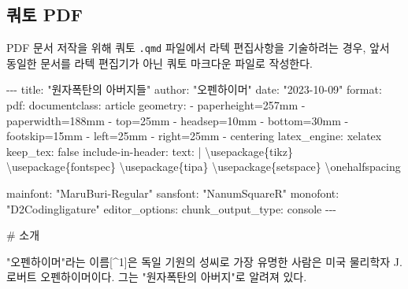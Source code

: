 \documentclass[
  letterpaper,
]{book}
\newenvironment{Shaded}{\begin{snugshade}}{\end{snugshade}}
\newcommand{\CommentTok}[1]{\textcolor[rgb]{0.37,0.37,0.37}{#1}}
\newcommand{\ExtensionTok}[1]{\textcolor[rgb]{0.00,0.23,0.31}{#1}}
\newcommand{\KeywordTok}[1]{\textcolor[rgb]{0.00,0.23,0.31}{#1}}
\newcommand{\NormalTok}[1]{\textcolor[rgb]{0.00,0.23,0.31}{#1}}
\newcommand{\PreprocessorTok}[1]{\textcolor[rgb]{0.68,0.00,0.00}{#1}}
\newcommand{\SpecialStringTok}[1]{\textcolor[rgb]{0.13,0.47,0.30}{#1}}
\newcommand{\StringTok}[1]{\textcolor[rgb]{0.13,0.47,0.30}{#1}}
\begin{document}
\hypertarget{uxcffcuxd1a0-pdf}{%
\subsection{쿼토 PDF}\label{uxcffcuxd1a0-pdf}}

PDF 문서 저작을 위해 쿼토 \texttt{.qmd} 파일에서 라텍 편집사항을
기술하려는 경우, 앞서 동일한 문서를 라텍 편집기가 아닌 쿼토 마크다운
파일로 작성한다.

\begin{Shaded}
\begin{Highlighting}[]
\ExtensionTok{{-}{-}{-}}
\ExtensionTok{title:} \StringTok{"원자폭탄의 아버지들"}
\ExtensionTok{author:} \StringTok{"오펜하이머"}
\ExtensionTok{date:} \StringTok{"2023{-}10{-}09"}
\ExtensionTok{format:} 
  \ExtensionTok{pdf:}
    \ExtensionTok{documentclass:}\NormalTok{ article}
    \ExtensionTok{geometry:}                                 
      \ExtensionTok{{-}}\NormalTok{ paperheight=257mm}
      \ExtensionTok{{-}}\NormalTok{ paperwidth=188mm}
      \ExtensionTok{{-}}\NormalTok{ top=25mm    }
      \ExtensionTok{{-}}\NormalTok{ headsep=10mm  }
      \ExtensionTok{{-}}\NormalTok{ bottom=30mm     }
      \ExtensionTok{{-}}\NormalTok{ footskip=15mm           }
      \ExtensionTok{{-}}\NormalTok{ left=25mm}
      \ExtensionTok{{-}}\NormalTok{ right=25mm}
      \ExtensionTok{{-}}\NormalTok{ centering       }
    \ExtensionTok{latex\_engine:}\NormalTok{ xelatex}
    \ExtensionTok{keep\_tex:}\NormalTok{ false}
    \ExtensionTok{include{-}in{-}header:}
      \ExtensionTok{text:} \KeywordTok{|}    
        \ExtensionTok{\textbackslash{}usepackage\{tikz\}}
        \ExtensionTok{\textbackslash{}usepackage\{fontspec\}}
        \ExtensionTok{\textbackslash{}usepackage\{tipa\}}
        \ExtensionTok{\textbackslash{}usepackage\{setspace\}}
        \ExtensionTok{\textbackslash{}onehalfspacing}

\ExtensionTok{mainfont:} \StringTok{"MaruBuri{-}Regular"}
\ExtensionTok{sansfont:} \StringTok{"NanumSquareR"}
\ExtensionTok{monofont:} \StringTok{"D2Codingligature"}
\ExtensionTok{editor\_options:} 
  \ExtensionTok{chunk\_output\_type:}\NormalTok{ console}
\ExtensionTok{{-}{-}{-}}

\CommentTok{\# 소개}

\StringTok{"오펜하이머"}\ExtensionTok{라는}\NormalTok{ 이름}\PreprocessorTok{[\^{}}\SpecialStringTok{1}\PreprocessorTok{]}\NormalTok{은 독일 기원의 성씨로 가장 유명한 사람은 미국 물리학자 J. 로버트 오펜하이머이다. 그는 }\StringTok{"원자폭탄의 아버지"}\NormalTok{로 알려져 있다.}


\end{Highlighting}
\end{Shaded}
\end{document}
